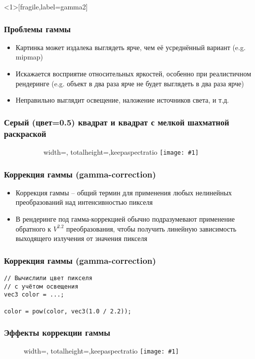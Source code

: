\documentclass[10pt]{beamer}
\newcommand{\slideimage}[1]{
  \begin{figure}
    \begin{adjustbox}{width=\textwidth, totalheight=\textheight-2\baselineskip-2\baselineskip,keepaspectratio}
      \texttt{[image: \#1]}
    \end{adjustbox}
  \end{figure}
}
\begin{document}

\begin{frame}<1>[fragile,label=gamma2]
\frametitle{Проблемы гаммы}
\begin{itemize}
\item Картинка может издалека выглядеть ярче, чем её усреднённый вариант (e.g. mipmap)
\pause
\item Искажается восприятие относительных яркостей, особенно при реалистичном рендеринге (e.g. объект в два раза ярче не будет выглядеть в два раза ярче)
\pause
\item Неправильно выглядит освещение, наложение источников света, и т.д.
\end{itemize}
\end{frame}

\begin{frame}
\frametitle{Серый (цвет=0.5) квадрат и квадрат с мелкой шахматной раскраской}
\begin{figure}
\slideimage{gamma-checkers.png}
\end{figure}
\end{frame}


\begin{frame}[fragile]
\frametitle{Коррекция гаммы (gamma-correction)}
\begin{itemize}
\item Коррекция гаммы -- общий термин для применения любых нелинейных преобразований над интенсивностью пикселя
\pause
\item В рендеринге под гамма-коррекцией обычно подразумевают применение обратного к \begin{math}V^{2.2}\end{math} преобразования, чтобы получить линейную зависимость выходящего излучения от значения пикселя
\end{itemize}
\end{frame}

\begin{frame}[fragile]
\frametitle{Коррекция гаммы (gamma-correction)}
\begin{verbatim}
// Вычислили цвет пикселя
// с учётом освещения
vec3 color = ...;

color = pow(color, vec3(1.0 / 2.2));
\end{verbatim}
\end{frame}

\begin{frame}[fragile]
\frametitle{Эффекты коррекции гаммы}
\slideimage{gamma-ex1.png}
\end{frame}
\end{document}
